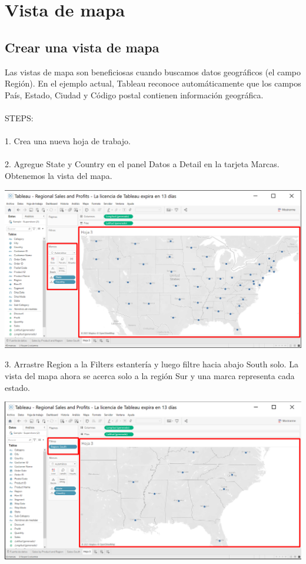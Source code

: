 \documentclass[12pt,letterpaper]{article}
\begin{document}
\section{Vista de mapa}
\subsection{Crear una vista de mapa}
Las vistas de mapa son beneficiosas cuando buscamos datos geográficos (el campo
Región). En el ejemplo actual, Tableau reconoce automáticamente que los campos
País, Estado, Ciudad y Código postal contienen información geográfica.
\\\\STEPS:
\\\\1. Crea una nueva hoja de trabajo.
\\\\2. Agregue State y Country en el panel Datos a Detail en la tarjeta Marcas. Obtenemos la
vista del mapa.
\begin{center}
    \includegraphics[width=16cm]{img/21.png}  
\end{center}
3. Arrastre Region a la Filters estantería y luego filtre hacia abajo South solo. La vista del
mapa ahora se acerca solo a la región Sur y una marca representa cada estado.
\begin{center}
    \includegraphics[width=16cm]{img/22.png}  
\end{center}
\end{document}
